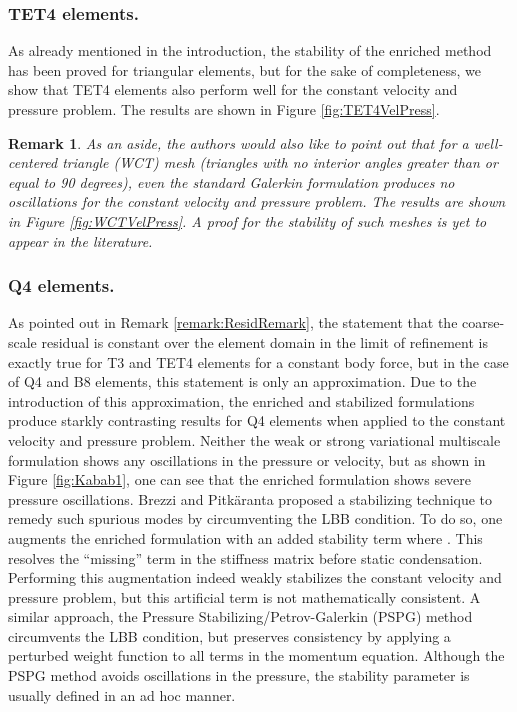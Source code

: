 \documentclass[11pt]{amsart}
\newtheorem{remark}[theorem]{Remark}
\begin{document}
\subsubsection{TET4 elements.}
As already mentioned in the introduction, the stability of the enriched method has been proved for triangular elements, but for the sake of completeness, we show that TET4 elements also perform well for the constant velocity and pressure problem.  The results are shown in Figure \ref{fig:TET4VelPress}.
\begin{remark}
As an aside, the authors would also like to point out that for a well-centered triangle (WCT) mesh (triangles with no interior angles greater than or equal to 90 degrees), even the standard Galerkin formulation produces no oscillations for the constant velocity and pressure problem.  The results are shown in Figure \ref{fig:WCTVelPress}.  A proof for the stability of such meshes is yet to appear in the literature.
\end{remark}


\subsubsection{Q4 elements.}
As pointed out in Remark \ref{remark:ResidRemark}, the statement that the coarse-scale residual is constant over the element domain in the limit of refinement is exactly true for T3 and TET4 elements for a constant body force, but in the case of Q4 and B8 elements, this statement is only an approximation.  Due to the introduction of this approximation, the enriched and stabilized formulations produce starkly contrasting results for Q4 elements when applied to the constant velocity and pressure problem.  Neither the weak or strong variational multiscale formulation shows any oscillations in the pressure or velocity, but as shown in Figure \ref{fig:Kabab1}, one can see that the enriched formulation shows severe pressure oscillations.
Brezzi and Pitk\"{a}ranta \cite{Mulder} proposed a stabilizing technique to remedy such spurious modes by circumventing the LBB condition.  To do so, one augments the enriched formulation with an added stability term  where .  This resolves the ``missing''  term in the stiffness matrix before static condensation.  Performing this augmentation indeed weakly stabilizes the constant velocity and pressure problem, but this artificial term is not mathematically consistent.  A similar approach, the Pressure Stabilizing/Petrov-Galerkin (PSPG) method \cite{PSPG} circumvents the LBB condition, but preserves consistency by applying a perturbed weight function to all terms in the momentum equation.  Although the PSPG method avoids oscillations in the pressure, the stability parameter is usually defined in an ad hoc manner.
\end{document}
